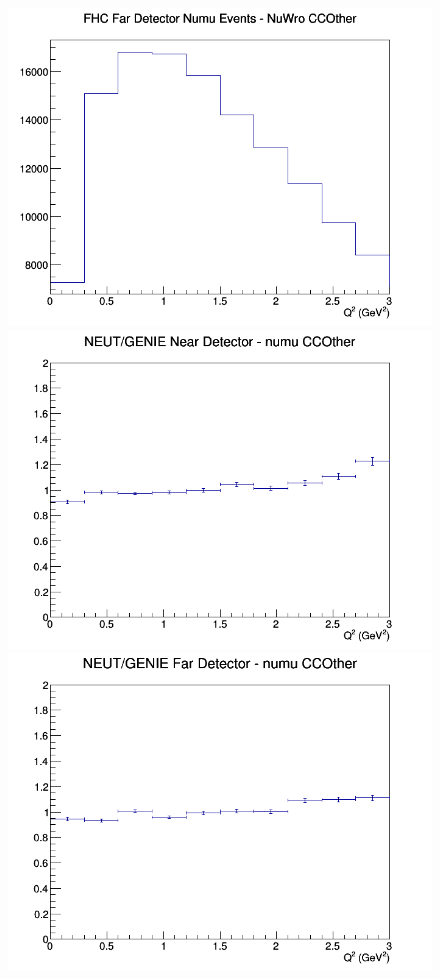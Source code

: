 \documentclass[12pt]{article}
\begin{document}
\begin{figure}[h]
\endminipage
{}
\includegraphics[width=\linewidth]{Q2/nominal/CCOther_FHC_FD_numu_Q2_NuWro.png}
\endminipage
\newline
{}
\includegraphics[width=\linewidth]{Q2/nominal/ratios/CCOther_NEUT_GENIE_numu_near_Q2.png}
\endminipage
{}
\includegraphics[width=\linewidth]{Q2/nominal/ratios/CCOther_NEUT_GENIE_numu_far_Q2.png}

\end{figure}
\end{document}
